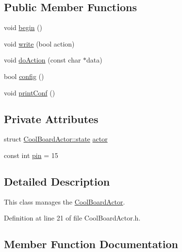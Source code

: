 \subsection*{Public Member Functions}
\begin{DoxyCompactItemize}
\item 
void \hyperlink{class_cool_board_actor_a7f4422fd85a5510bc2cdfd68e109be5e}{begin} ()
\item 
void \hyperlink{class_cool_board_actor_a958786ff01ea1056ee72c72d439f86da}{write} (bool action)
\item 
void \hyperlink{class_cool_board_actor_a96a45658d32c6b95caa2f385c7da32cd}{do\+Action} (const char $\ast$data)
\item 
bool \hyperlink{class_cool_board_actor_a5af5538fc7d169f63127e06d5219bcd4}{config} ()
\item 
void \hyperlink{class_cool_board_actor_aabb10e7aebc3249ffc940530de29f84a}{print\+Conf} ()
\end{DoxyCompactItemize}
\subsection*{Private Attributes}
\begin{DoxyCompactItemize}
\item 
struct \hyperlink{struct_cool_board_actor_1_1state}{Cool\+Board\+Actor\+::state} \hyperlink{class_cool_board_actor_a8f190db9f7a39fddbcef7f152da970e9}{actor}
\item 
const int \hyperlink{class_cool_board_actor_a8b5c0b41fe6033b68d9e1ed00bc2e122}{pin} = 15
\end{DoxyCompactItemize}


\subsection{Detailed Description}
This class manages the \hyperlink{class_cool_board_actor}{Cool\+Board\+Actor}. 

Definition at line 21 of file Cool\+Board\+Actor.\+h.



\subsection{Member Function Documentation}
\mbox{\label{class_cool_board_actor_a7f4422fd85a5510bc2cdfd68e109be5e}} 
